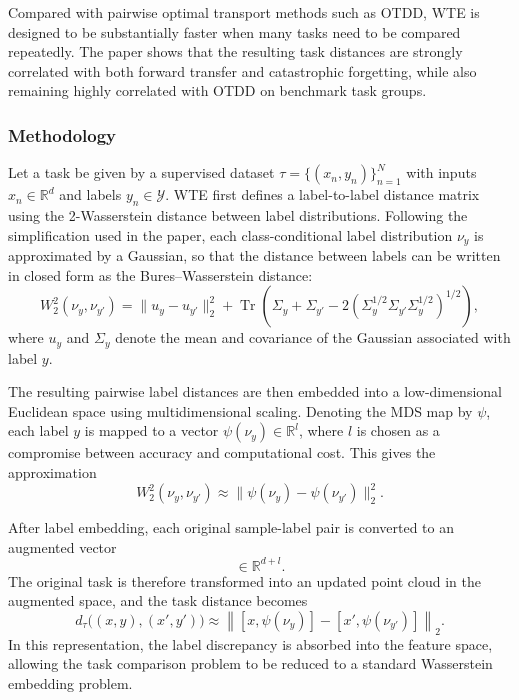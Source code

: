 \documentclass[peerreview]{IEEEtran}
\begin{document}
Compared with pairwise optimal transport methods such as OTDD, WTE is
designed to be substantially faster when many tasks need to be
compared repeatedly. The paper shows that the resulting task
distances are strongly correlated with both forward transfer and
catastrophic forgetting, while also remaining highly correlated with
OTDD on benchmark task groups.

\subsubsection*{Methodology}
Let a task be given by a supervised dataset
$\tau = \{(x_n, y_n)\}_{n=1}^{N}$ with inputs $x_n \in \mathbb{R}^{d}$ and
labels $y_n \in \mathcal{Y}$. WTE first defines a label-to-label
distance matrix using the 2-Wasserstein distance between label
distributions. Following the simplification used in the paper, each
class-conditional label distribution $\nu_y$ is approximated by a
Gaussian, so that the distance between labels can be written in
closed form as the Bures--Wasserstein distance:
\begin{equation}
W_2^2(\nu_y, \nu_{y'})
=
\|u_y - u_{y'}\|_2^2
+
\operatorname{Tr}\!\left(
\Sigma_y + \Sigma_{y'}
- 2(\Sigma_y^{1/2}\Sigma_{y'}\Sigma_y^{1/2})^{1/2}
\right),
\end{equation}
where $u_y$ and $\Sigma_y$ denote the mean and covariance of the
Gaussian associated with label $y$.

The resulting pairwise label distances are then embedded into a
low-dimensional Euclidean space using multidimensional scaling.
Denoting the MDS map by $\psi$, each label $y$ is mapped to a vector
$\psi(\nu_y) \in \mathbb{R}^{l}$, where $l$ is chosen as a compromise
between accuracy and computational cost. This gives the
approximation
\begin{equation}
W_2^2(\nu_y, \nu_{y'})
\approx
\|\psi(\nu_y) - \psi(\nu_{y'})\|_2^2.
\end{equation}

After label embedding, each original sample-label pair is converted
to an augmented vector
\begin{equation}
[x, \psi(\nu_y)] \in \mathbb{R}^{d+l}.
\end{equation}
The original task is therefore transformed into an updated point
cloud in the augmented space, and the task distance becomes
\begin{equation}
d_{\tau}\bigl((x,y),(x',y')\bigr)
\approx
\left\|
[x, \psi(\nu_y)] - [x', \psi(\nu_{y'})]
\right\|_2.
\end{equation}
In this representation, the label discrepancy is absorbed into the
feature space, allowing the task comparison problem to be reduced to a
standard Wasserstein embedding problem.
\end{document}
